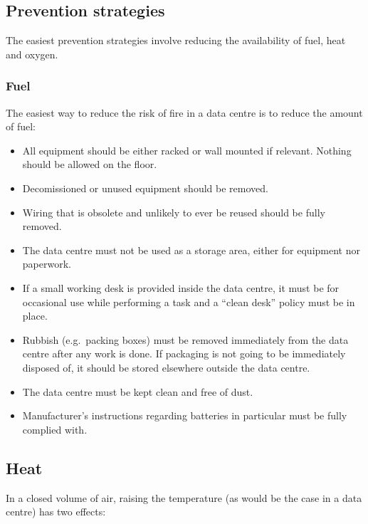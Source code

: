 \documentclass{pgnotes}
\begin{document}

\subsection{Prevention strategies}
\label{sec:prevention-strategies}

The easiest prevention strategies involve reducing the availability of
fuel, heat and oxygen.

\subsubsection{Fuel}
\label{sec:fuel}

The easiest way to reduce the risk of fire in a data centre is to reduce
the amount of fuel:

\begin{itemize}
\item
  All equipment should be either racked or wall mounted if relevant.
  Nothing should be allowed on the floor.
\item
  Decomissioned or unused equipment should be removed.
\item
  Wiring that is obsolete and unlikely to ever be reused should be fully
  removed.
\item
  The data centre must not be used as a storage area, either for
  equipment nor paperwork.
\item
  If a small working desk is provided inside the data centre, it must be
  for occasional use while performing a task and a ``clean desk'' policy
  must be in place.
\item
  Rubbish (e.g.~packing boxes) must be removed immediately from the data
  centre after any work is done. If packaging is not going to be
  immediately disposed of, it should be stored elsewhere outside the
  data centre.
\item
  The data centre must be kept clean and free of dust.
\item
  Manufacturer's instructions regarding batteries in particular must be
  fully complied with.
\end{itemize}

\subsection{Heat}
\label{sec:heat}

In a closed volume of air, raising the temperature (as would be the case
in a data centre) has two effects:
\end{document}

